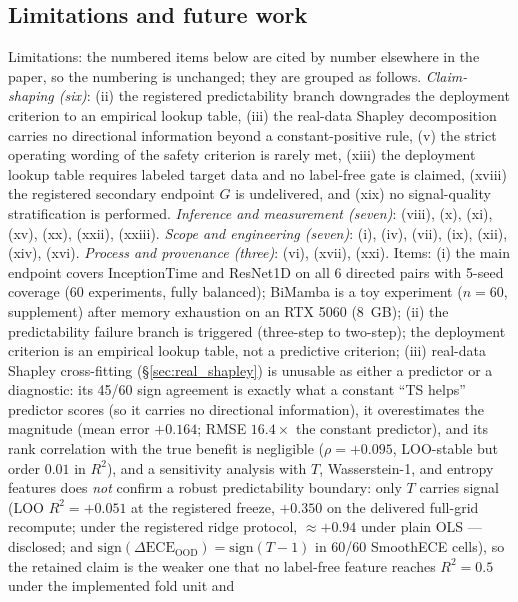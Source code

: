 \documentclass[final,5p,times,nonatbib]{elsarticle}
\begin{document}
\subsection{Limitations and future work}
Limitations: the numbered items below are cited by number elsewhere in
the paper, so the numbering is unchanged; they are grouped as follows.
\emph{Claim-shaping (six)}: (ii) the registered predictability branch
downgrades the deployment criterion to an empirical lookup table, (iii)
the real-data Shapley decomposition carries no directional information
beyond a constant-positive rule, (v) the strict operating wording of
the safety criterion is rarely met, (xiii) the deployment lookup table
requires labeled target data and no label-free gate is claimed,
(xviii) the registered secondary endpoint $G$ is undelivered, and (xix)
no signal-quality stratification is performed. \emph{Inference and
measurement (seven)}: (viii), (x), (xi), (xv), (xx), (xxii), (xxiii).
\emph{Scope and engineering (seven)}: (i), (iv), (vii), (ix), (xii),
(xiv), (xvi). \emph{Process and provenance (three)}: (vi), (xvii),
(xxi). Items: (i) the main endpoint covers InceptionTime and
ResNet1D on all 6 directed pairs with 5-seed coverage (60 experiments,
fully balanced); BiMamba is a toy experiment ($n=60$, supplement) after
memory exhaustion on an RTX 5060 (8~GB); (ii) the predictability failure
branch is triggered (three-step to two-step); the deployment criterion
is an empirical lookup table, not a predictive criterion; (iii)
real-data Shapley cross-fitting (\S\ref{sec:real_shapley}) is unusable
as either a predictor or a diagnostic: its 45/60 sign agreement is
exactly what a constant ``TS helps'' predictor scores (so it carries no
directional information), it overestimates the magnitude (mean error
$+0.164$; RMSE $16.4\times$ the constant predictor), and its rank
correlation with the true benefit is negligible
($\rho=+0.095$, LOO-stable but order $0.01$ in $R^2$), and a sensitivity analysis with $T$, Wasserstein-1, and
entropy features does \emph{not} confirm a robust predictability
boundary: only $T$ carries signal (LOO $R^2=+0.051$ at the registered
freeze, $+0.350$ on the delivered full-grid recompute; under the
registered ridge protocol, $\approx+0.94$ under plain OLS ---
disclosed; and
$\mathrm{sign}(\Delta\text{ECE}_{\text{OOD}})=\mathrm{sign}(T-1)$ in
60/60 SmoothECE cells), so the retained claim is the weaker one that no
label-free feature reaches $R^2=0.5$ under the implemented fold unit and
\end{document}
